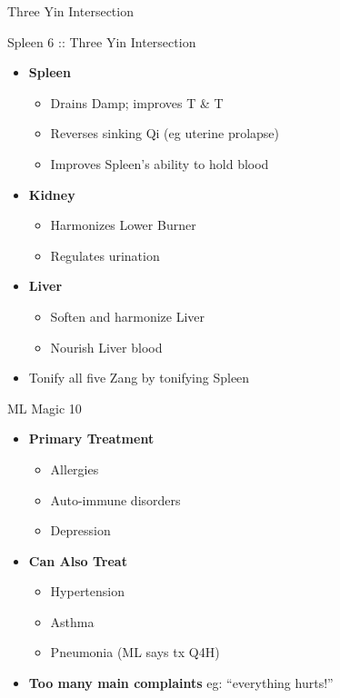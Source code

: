 \begin{frame}{Three Yin Intersection}

\large{Spleen 6 :: Three Yin Intersection}

\begin{itemize}

\item \textbf{Spleen}
\begin{itemize}
\item Drains Damp; improves T \& T
\item Reverses sinking Qi (eg uterine prolapse)
\item Improves Spleen's ability to hold blood
\end{itemize}

\item \textbf{Kidney}
\begin{itemize}
\item Harmonizes Lower Burner
\item Regulates urination
\end{itemize}

\item \textbf{Liver}
\begin{itemize}
\item Soften and harmonize Liver
\item Nourish Liver blood
\end{itemize}

\item Tonify all five Zang by tonifying Spleen
\end{itemize}

\end{frame}

\begin{frame}{ML Magic 10}

\begin{itemize}

\item \textbf{Primary Treatment}
\begin{itemize}
\item Allergies
\item Auto-immune disorders
\item Depression
\end{itemize}

\item \textbf{Can Also Treat}
\begin{itemize}
\item Hypertension
\item Asthma
\item Pneumonia (ML says tx Q4H)
\end{itemize}

\item \textbf{Too many main complaints} eg: ``everything hurts!''

\end{itemize}

\end{frame}

